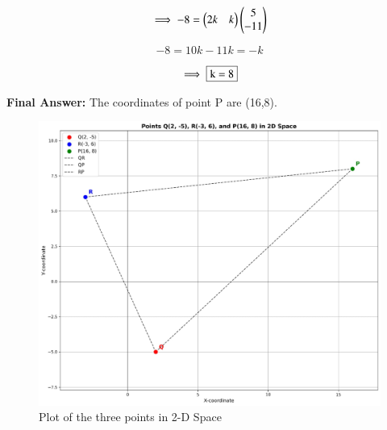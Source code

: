 \documentclass[journal,12pt,onecolumn]{IEEEtran}
\theoremstyle{remark}
\begin{document}
\begin{equation}
    \implies -8 = \begin{pmatrix}2k&k\end{pmatrix}\begin{pmatrix}5\\-11\end{pmatrix}
\end{equation}

\begin{equation}
    -8 = 10k - 11k = -k
\end{equation}

\begin{equation}
    \implies \fbox{k = 8}
\end{equation}
   

\bigskip

\textbf{Final Answer: }
The coordinates of point P are (16,8).

\begin{figure}
    \centering
    \includegraphics[width=1\columnwidth]{figs/1.jpg}
    \caption{Plot of the three points in 2-D Space}
    \label{fig:placeholder}
\end{figure}
\end{document}
